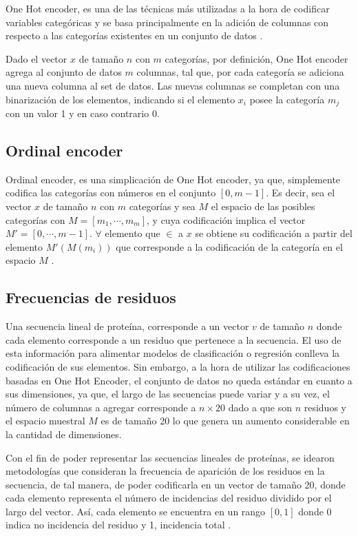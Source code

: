 One Hot encoder, es una de las técnicas más utilizadas a la hora de codificar variables categóricas y se basa principalmente en la adición de columnas con respecto a las categorías existentes en un conjunto de datos \cite{brownlee2017one}.

Dado el vector  $x$ de tamaño $n$ con $m$ categorías, por definición, One Hot encoder agrega al conjunto de datos $m$ columnas, tal que, por cada categoría se adiciona una nueva columna al set de datos. Las nuevas columnas se completan con una binarización de los elementos, indicando si el elemento $x_{i}$ posee la categoría $m_{j}$ con un valor 1 y en caso contrario 0. 

\subsection{Ordinal encoder}

Ordinal encoder, es una simplicación de One Hot encoder, ya que, simplemente codifica las categorías con números en el conjunto $[0, m-1]$. Es decir, sea el vector $x$ de tamaño $n$ con $m$ categorías y sea $M$ el espacio de las posibles categorías con $M = [m_{1}, \cdots, m_{m}]$, y cuya codificación implica el vector $M' = [0, \cdots, m-1]$. $\forall $ elemento que $\in$ a $x$ se obtiene su codificación a partir del elemento $M'(M(m_{i}))$ que corresponde a la codificación de la categoría en el espacio $M$ \cite{pedregosa2011scikit}.

\subsection{Frecuencias de residuos}

Una secuencia lineal de proteína, corresponde a un vector $v$ de tamaño $n$ donde cada elemento corresponde a un residuo que pertenece a la secuencia. El uso de esta información para alimentar modelos de clasificación o regresión conlleva la codificación de sus elementos. Sin embargo, a la hora de utilizar las codificaciones basadas en One Hot Encoder, el conjunto de datos no queda estándar en cuanto a sus dimensiones, ya que, el largo de las secuencias puede variar y a su vez, el número de columnas a agregar corresponde a $n \times 20$ dado a que son $n$ residuos y el espacio muestral $M$ es de tamaño 20 lo que genera un aumento considerable en la cantidad de dimensiones.

Con el fin de poder representar las secuencias lineales de proteínas, se idearon metodologías que consideran la frecuencia de aparición de los residuos en la secuencia, de tal manera, de poder codificarla en un vector de tamaño 20, donde cada elemento representa el número de incidencias del residuo dividido por el largo del vector. Así, cada elemento se encuentra en un rango $[0,1]$ donde 0 indica no incidencia del residuo y 1, incidencia total \cite{ozbudak2014protein}.

